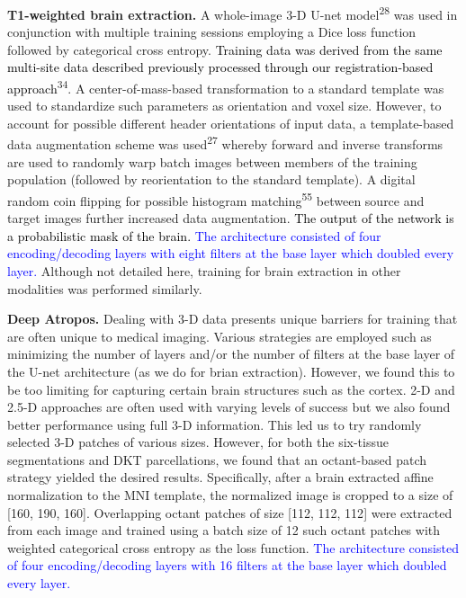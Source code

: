 \documentclass[12pt,]{article}
\begin{document}
\textbf{T1-weighted brain extraction.} A whole-image 3-D U-net
model\textsuperscript{28} was used in conjunction with multiple training
sessions employing a Dice loss function followed by categorical cross
entropy. \textcolor{black}{Training data
was derived from the same multi-site data described previously processed through
our registration-based approach}\textsuperscript{34}. A
center-of-mass-based transformation to a standard template was used to
standardize such parameters as orientation and voxel size. However, to
account for possible different header orientations of input data, a
template-based data augmentation scheme was used\textsuperscript{27}
whereby forward and inverse transforms are used to randomly warp batch
images between members of the training population (followed by
reorientation to the standard template). A digital random coin flipping
for possible histogram matching\textsuperscript{55} between source and
target images further increased data augmentation.
\textcolor{black}{The output of the network
is a probabilistic mask of the brain.} \textcolor{blue}{The architecture
consisted of four encoding/decoding layers with eight filters at the base layer
which doubled every layer.} Although not detailed here, training for
brain extraction in other modalities was performed similarly.

\textbf{Deep Atropos.} Dealing with 3-D data presents unique barriers
for training that are often unique to medical imaging. Various
strategies are employed such as minimizing the number of layers and/or
the number of filters at the base layer of the U-net architecture (as we
do for brian extraction). However, we found this to be too limiting for
capturing certain brain structures such as the cortex. 2-D and 2.5-D
approaches are often used with varying levels of success but we also
found better performance using full 3-D information. This led us to try
randomly selected 3-D patches of various sizes. However, for both the
six-tissue segmentations and DKT parcellations, we found that an
octant-based patch strategy yielded the desired results. Specifically,
after a brain extracted affine normalization to the MNI template, the
normalized image is cropped to a size of {[}160, 190, 160{]}.
Overlapping octant patches of size {[}112, 112, 112{]} were extracted
from each image and trained using a batch size of 12 such octant patches
with weighted categorical cross entropy as the loss function.
\textcolor{blue}{The architecture consisted of four encoding/decoding
layers with 16 filters at the base layer which doubled every layer.}
\end{document}
